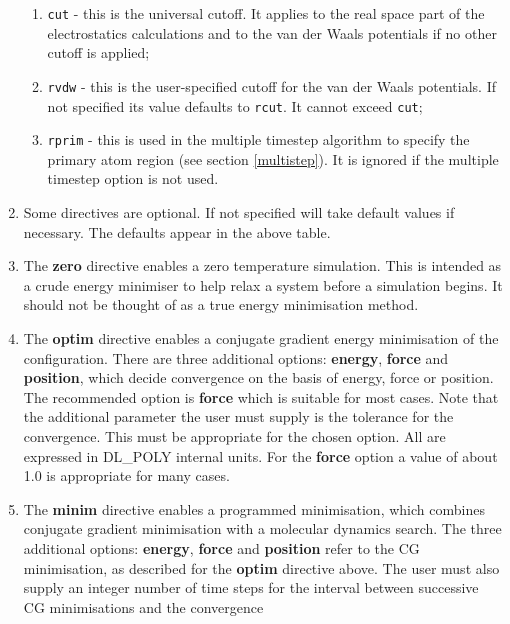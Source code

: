 \begin{enumerate}
      \begin{enumerate}
      \item {\tt cut} - this is the universal cutoff. It applies to
            the real space part of the electrostatics calculations and
            to the van der Waals potentials if no other cutoff is
            applied;
      \item {\tt rvdw} - this is the user-specified cutoff for the
            van der Waals potentials. If not specified its value
            defaults to {\tt rcut}. It cannot exceed {\tt cut};
      \item {\tt rprim} - this is used in the multiple timestep
            algorithm to specify the primary atom region (see section
            \ref{multistep}). It is ignored if the multiple
            timestep option is not used.
       \end{enumerate}
\item Some directives are optional. If not specified \D{} will
      take default values if necessary. The defaults appear in the
      above table.
\item The {\bf zero} directive enables a zero temperature simulation.
      This is intended as a crude energy minimiser to help relax a
      system before a simulation begins. It should not be thought of
      as a true energy minimisation method.  
\item The {\bf optim} directive enables a conjugate gradient energy
      minimisation of the configuration. There are three additional
      options: {\bf energy}, {\bf force} and {\bf position}, which
      decide convergence on the basis of energy, force or
      position. The recommended option is {\bf force} which is
      suitable for most cases. Note that the additional parameter the
      user must supply is the tolerance for the convergence. This must
      be appropriate for the chosen option. All are expressed in
      DL\_POLY internal units. For the {\bf force} option a value of
      about 1.0 is appropriate for many cases.
\item The {\bf minim} directive enables a programmed minimisation,
      which combines conjugate gradient minimisation with a molecular
      dynamics search. The three additional options: {\bf energy},
      {\bf force} and {\bf position} refer to the CG minimisation, as
      described for the {\bf optim} directive above. The user must
      also supply an integer number of time steps for the interval
      between successive CG minimisations and the convergence

\end{enumerate}
